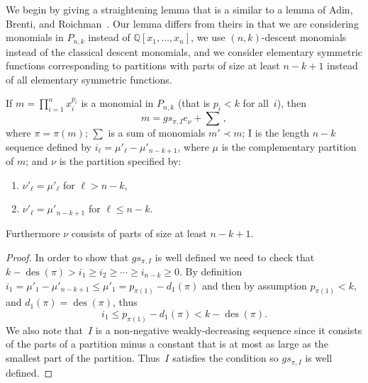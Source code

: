 \documentclass[ALCO,ThmDefs,Unicode,epreuves]{cedram}
\DeclareMathOperator{\des}{des}
\begin{document}
We begin by giving a straightening lemma that is a similar to a lemma of Adin, Brenti, and Roichman~\cite{ABR}. Our lemma 
differs from theirs in that we are considering monomials in $P_{n,k}$ instead of $\mathbb{Q}[x_1,\ldots, x_n]$, we use 
$(n,k)$-descent monomials instead of the classical descent monomials, and we consider elementary symmetric functions 
corresponding to partitions with parts of size at least $n-k+1$ instead of all elementary symmetric functions.
\begin{lemm}

\label{OrderLem}
If $m=\prod_{i=1}^n x_i^{p_i}$ is a monomial in $P_{n,k}$ \textup{(}that is $p_i<k$ for all~$i$\textup{)}, then 
		\begin{equation}
m=gs_{\pi,I}e_\nu+\sum\,,
\end{equation}
 where $\pi=\pi(m)$; $\sum$ is a sum of monomials $m'\prec m$; I is the length $n-k$ sequence defined by 
$i_\ell=\mu'_{\ell}-\mu'_{n-k+1}$, where $\mu$ is the complementary partition of $m$; and $\nu$ is the partition specified by:

	\begin{enumerate}

		\item $\nu'_\ell=\mu'_\ell$ for $\ell> n-k$,

		\item $\nu'_\ell=\mu'_{n-k+1}$ for $\ell\leq n-k$.
	
	\end{enumerate}

Furthermore $\nu$ consists of parts of size at least $n-k+1$.		

	\begin{proof}
	In order to show that $gs_{\pi,I}$ is well defined we need to check that $k-\des (\pi)>i_1\geq i_2\geq\cdots\geq i_{n-k}\geq 
0$. By definition $i_1=\mu'_1-\mu'_{n-k+1}\leq \mu'_1=p_{\pi(1)}-d_1(\pi)$ and then by assumption $p_{\pi(1)}<k$, and 
$d_1(\pi)=\des (\pi)$, thus 
		\begin{equation}
i_1\leq p_{\pi(1)}-d_1(\pi)<k-\des (\pi).
\end{equation}
	We also note that~$I$ is a non-negative weakly-decreasing sequence since it consists of the parts of a partition minus a 
constant that is at most as large as the smallest part of the partition. Thus~$I$ satisfies the condition so $gs_{\pi,I}$ 
is well defined.
	

\end{proof}
\end{lemm}
\end{document}
